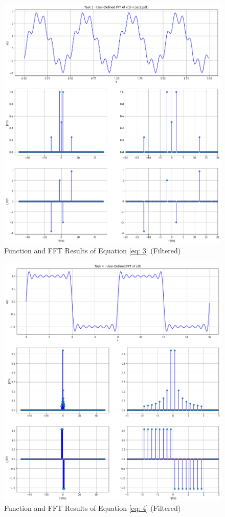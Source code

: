 \documentclass[12pt]{report}
\begin{document}
\begin{figure}[h!]
  \centering
  \includegraphics[width=\linewidth]{p1t3f.png}
  \caption{Function and FFT Results of Equation \eqref{eq: 3} (Filtered)}
  \label{fig: p1t3f}
\end{figure}
\begin{figure}[h!]
  \centering
  \includegraphics[width=\linewidth]{p1t5.png}
  \caption{Function and FFT Results of Equation \eqref{eq: 4} (Filtered)}
  \label{fig: p1t5}
\end{figure}
\end{document}
